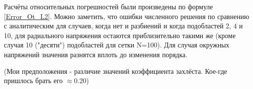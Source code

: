 \documentclass[a4paper,14pt]{extarticle}
\begin{document}
Расчёты относительных погрешностей были произведены по формуле \ref{Error_Ot_L2}. Можно заметить, что ошибки численного решения по сравнению с аналитическим для случаев, когда нет и разбиений и когда подобластей 2, 4 и 10, для радиального напряжения остаются приблизительно такими же (кроме случая 10 ("десяти") подобластей для сетки N=100). Для случая окружных напряжений значения разнятся вплоть до изменения порядка. 

(Мои предположения - различие значений коэффициента захлёста. Кое-где пришлось брать его $\approx$0.20)
\end{document}
